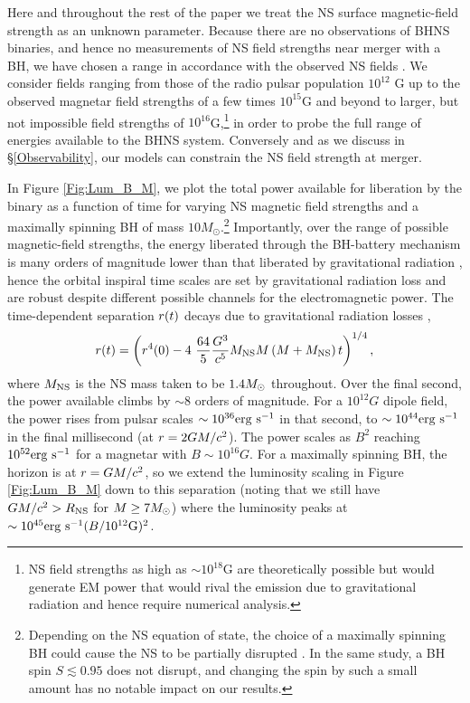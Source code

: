 Here and throughout the rest of the paper we treat the NS surface magnetic-field strength as an unknown parameter. Because there are no observations of BHNS binaries, and hence no measurements of NS field strengths near merger with a BH, we have chosen a range in accordance with the observed NS fields \citep[see \textit{e.g.}][]{Kaspi:2016}. We consider fields ranging from those of the radio pulsar population $10^{12}$ G up to the observed magnetar field strengths of a few times $10^{15}$G \citep{Magnetars:2014} and beyond to larger, but not impossible field strengths of $10^{16}$G,\footnote{NS field strengths as high as $\sim10^{18}$G are theoretically possible but would generate EM power that would rival the emission due to gravitational radiation and hence require numerical analysis.} in order to probe the full range of energies available to the BHNS system. 
Conversely and as we discuss in \S \ref{Observability}, our models can constrain the NS field strength at merger.


In Figure \ref{Fig:Lum_B_M}, we plot the total power available for
liberation by the binary as a function of time for varying NS magnetic
field strengths and a maximally spinning BH of mass $10M_\odot$.\footnote{Depending on the NS equation of state, the choice of a maximally spinning BH could cause the NS to be partially disrupted \citep[\textit{e.g.}][]{Foucart:2012}. In the same study, a BH spin $S\lesssim0.95$ does not disrupt, and changing the spin by such a small amount has no notable impact on our results.}
Importantly, over the range of possible magnetic-field strengths, 
the energy liberated through the BH-battery mechanism is
many orders of magnitude lower than that liberated by gravitational
radiation \citep{McL:2011}, hence the orbital inspiral time scales are
set by gravitational radiation loss and are robust despite different
possible channels for the electromagnetic power.  The time-dependent
separation $r(t)$ decays due to gravitational radiation losses
\cite{Peters64},
\begin{align}
\label{PetersSep}
r(t) = \left( r^4(0) - 4 \ \frac{64}{5} \frac{G^3}{c^5} M_{\rm NS} M \left(M + M_{\rm NS}\right) t \right)^{1/4},
\end{align}
where $M_{\rm NS}$ is the NS mass taken to be $1.4 {M_{\odot}}$ throughout.
Over the final second, the power available climbs by $\sim8$ orders of
magnitude. For a $10^{12}G$ dipole field, the power rises from pulsar
scales $\sim 10^{36} {\rm erg \ s}^{-1}$ in that second, to
$\sim10^{44} {\rm erg \ s}^{-1}$ in the final millisecond (at $r=2
G M/c^2$).  The power scales as $B^2$ reaching $10^{52} {\rm erg
  \ s}^{-1}$ for a magnetar with $B\sim10^{16}G$. For a maximally
spinning BH, the horizon is at $r=G M/c^2$, so we extend the
luminosity scaling in Figure \ref{Fig:Lum_B_M} down to this separation
(noting that we still have $GM/c^2 > R_{\rm{NS}}$ for $M \geq 7
{M_{\odot}}$) where the luminosity peaks at $\sim 10^{45} {\rm erg \ s}^{-1}
(B/10^{12} \rm{G})^2$.
  



